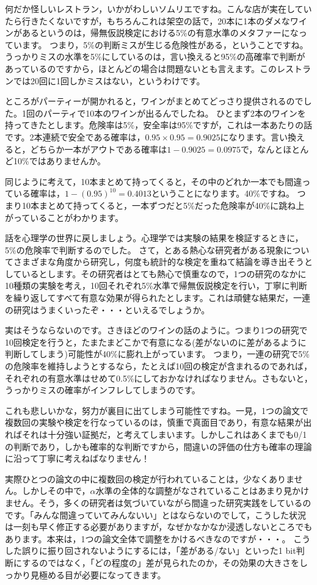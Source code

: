 \documentclass{ltjsbook}
\begin{document}
何だか怪しいレストラン，いかがわしいソムリエですね。こんな店が実在していたら行きたくないですが，もちろんこれは架空の話で，20本に1本のダメなワインがあるというのは，帰無仮説検定における5\%の有意水準のメタファーになっています。
つまり，5\%の判断ミスが生じる危険性がある，ということですね。
うっかりミスの水準を5\%にしているのは，言い換えると95\%の高確率で判断があっているのですから，ほとんどの場合は問題ないとも言えます。このレストランでは20回に1回しかミスはない，というわけです。

ところがパーティーが開かれると，ワインがまとめてどっさり提供されるのでした。1回のパーティで10本のワインが出るんでしたね。
ひとまず2本のワインを持ってきたとします。危険率は5\%，安全率は95\%ですが，これは一本あたりの話です。2本連続で安全である確率は，$0.95\times 0.95=0.9025$になります。言い換えると，どちらか一本がアウトである確率は$1-0.9025=0.0975$で，なんとほとんど10\%ではありませんか。

同じように考えて，10本まとめて持ってくると，その中のどれか一本でも間違っている確率は，$1-(0.95)^{10}=0.4013$ということになります。40\%ですね。
つまり10本まとめて持ってくると，一本ずつだと5\%だった危険率が40\%に跳ね上がっていることがわかります。

話を心理学の世界に戻しましょう。心理学では実験の結果を検証するときに，5\%の危険率で判断するのでした。
さて，とある熱心な研究者がある現象についてさまざまな角度から研究し，何度も統計的な検定を重ねて結論を導き出そうとしているとします。その研究者はとても熱心で慎重なので，1つの研究のなかに10種類の実験を考え，10回それぞれ5\%水準で帰無仮説検定を行い，丁寧に判断を繰り返してすべて有意な効果が得られたとします。これは頑健な結果だ，一連の研究はうまくいったぞ・・・といえるでしょうか。

実はそうならないのです。さきほどのワインの話のように。つまり1つの研究で10回検定を行うと，たまたまどこかで有意になる(差がないのに差があるように判断してしまう)可能性が40\%に膨れ上がっています。
つまり，一連の研究で5\%の危険率を維持しようとするなら，たとえば10回の検定が含まれるのであれば，それぞれの有意水準はせめて0.5\%にしておかなければなりません。さもないと，うっかりミスの確率がインフレしてしまうのです。

これも悲しいかな，努力が裏目に出てしまう可能性ですね。一見，1つの論文で複数回の実験や検定を行なっているのは，慎重で真面目であり，有意な結果が出ればそれは十分強い証拠だ，と考えてしまいます。しかしこれはあくまでも0/1の判断であり，しかも確率的な判断ですから，間違いの評価の仕方も確率の理論に沿って丁寧に考えねばなりません！

実際ひとつの論文の中に複数回の検定が行われていることは，少なくありません。しかしその中で，$\alpha$水準の全体的な調整がなされていることはあまり見かけません。そう，多くの研究者は気づいていながら間違った研究実践をしているのです。「みんな間違っていてみんないい」とはならないのでして，こうした状況は一刻も早く修正する必要がありますが，なぜかなかなか浸透しないところでもあります。本来は，1つの論文全体で調整をかけるべきなのですが・・・。
こうした誤りに振り回されないようにするには，「差がある/ない」といった1 bit判断にするのではなく，「どの程度の」差が見られたのか，その効果の大きさをしっかり見極める目が必要になってきます。
\end{document}
